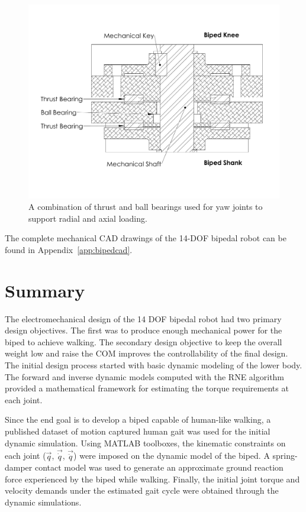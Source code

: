 \begin{figure}[!ht]
	\begin{center}
    \includegraphics[trim = 5mm 34mm 5mm 25mm,clip,width=15cm]{fig/design/yawbearing.pdf}
	\end{center}
  \caption{A combination of thrust and ball bearings used for yaw joints to support radial and axial loading.}
\label{fig:yawbearing}
\end{figure}

The complete mechanical CAD drawings of the 14-DOF bipedal robot can be found in Appendix~\ref{app:bipedcad}. 



\section{Summary} %
\label{sec:design_summary}
The electromechanical design of the 14 DOF bipedal robot had two primary design objectives. The first was to produce enough mechanical power for the biped to achieve walking. The secondary design objective to keep the overall weight low and raise the COM improves the controllability of the final design. The initial design process started with basic dynamic modeling of the lower body. The forward and inverse dynamic models computed with the RNE algorithm provided a mathematical framework for estimating the torque requirements at each joint. 

Since the end goal is to develop a biped capable of human-like walking, a published dataset of motion captured human gait was used for the initial dynamic simulation. Using MATLAB toolboxes, the kinematic constraints on each joint ($\vec{q}$, $\vec{\dot{q}}$, $\vec{\ddot{q}}$) were imposed on the dynamic model of the biped. A spring-damper contact model was used to generate an approximate ground reaction force experienced by the biped while walking. Finally, the initial joint torque and velocity demands under the estimated gait cycle were obtained through the dynamic simulations. 

